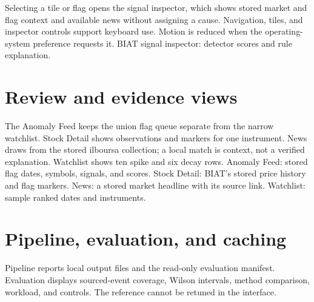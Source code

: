 Selecting a tile or flag opens the signal inspector, which shows stored
market and flag context and available news without assigning a cause.
Navigation, tiles, and inspector controls support keyboard use. Motion is
reduced when the operating-system preference requests it.
{BIAT signal inspector: detector scores and rule explanation.}

\section{Review and evidence views}
The Anomaly Feed keeps the union flag queue separate from the narrow
watchlist. Stock Detail shows observations and markers for one instrument.
News draws from the stored ilboursa collection; a local match is context,
not a verified explanation. Watchlist shows ten spike and six decay rows.
{Anomaly Feed: stored flag dates, symbols, signals, and scores.}
{Stock Detail: BIAT's stored price history and flag markers.}
{News: a stored market headline with its source link.}
{Watchlist: sample ranked dates and instruments.}

\section{Pipeline, evaluation, and caching}
Pipeline reports local output files and the read-only evaluation manifest.
Evaluation displays sourced-event coverage, Wilson intervals, method
comparison, workload, and controls. The reference cannot be retuned in the
interface.
